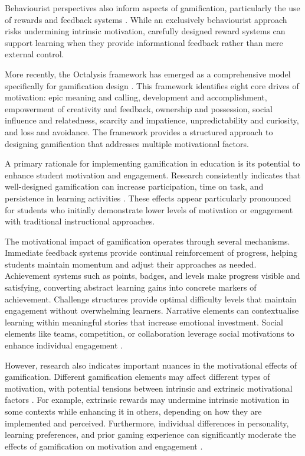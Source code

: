 \documentclass[cte]{acnsart}
\begin{document}
Behaviourist perspectives also inform aspects of gamification, particularly the use of rewards and feedback systems \cite{Nunez-Naranjo2024106}. While an exclusively behaviourist approach risks undermining intrinsic motivation, carefully designed reward systems can support learning when they provide informational feedback rather than mere external control.

More recently, the Octalysis framework has emerged as a comprehensive model specifically for gamification design \cite{Ho2024139}. This framework identifies eight core drives of motivation: epic meaning and calling, development and accomplishment, empowerment of creativity and feedback, ownership and possession, social influence and relatedness, scarcity and impatience, unpredictability and curiosity, and loss and avoidance. The framework provides a structured approach to designing gamification that addresses multiple motivational factors.


A primary rationale for implementing gamification in education is its potential to enhance student motivation and engagement. Research consistently indicates that well-designed gamification can increase participation, time on task, and persistence in learning activities \cite{Mitchell2024184, Zainuddin20241261}. These effects appear particularly pronounced for students who initially demonstrate lower levels of motivation or engagement with traditional instructional approaches.

The motivational impact of gamification operates through several mechanisms. Immediate feedback systems provide continual reinforcement of progress, helping students maintain momentum and adjust their approaches as needed. Achievement systems such as points, badges, and levels make progress visible and satisfying, converting abstract learning gains into concrete markers of achievement. Challenge structures provide optimal difficulty levels that maintain engagement without overwhelming learners. Narrative elements can contextualise learning within meaningful stories that increase emotional investment. Social elements like teams, competition, or collaboration leverage social motivations to enhance individual engagement \cite{Humeniuk2022113}.

However, research also indicates important nuances in the motivational effects of gamification. Different gamification elements may affect different types of motivation, with potential tensions between intrinsic and extrinsic motivational factors \cite{Ho2024139}. For example, extrinsic rewards may undermine intrinsic motivation in some contexts while enhancing it in others, depending on how they are implemented and perceived. Furthermore, individual differences in personality, learning preferences, and prior gaming experience can significantly moderate the effects of gamification on motivation and engagement \cite{Prieto-Andreu2024244}.
\end{document}
